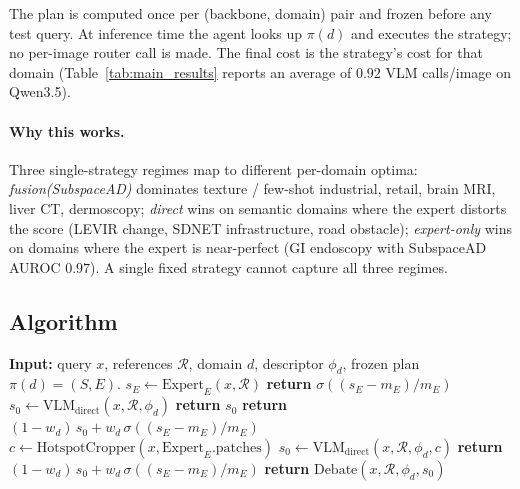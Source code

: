 The plan is computed once per (backbone, domain) pair and frozen before any test query. At inference time the agent looks up $\pi(d)$ and executes the strategy; no per-image router call is made. The final cost is the strategy's cost for that domain (Table~\ref{tab:main_results} reports an average of $0.92$ VLM calls/image on Qwen3.5).

\paragraph{Why this works.} Three single-strategy regimes map to different per-domain optima: \emph{fusion(SubspaceAD)} dominates texture / few-shot industrial, retail, brain MRI, liver CT, dermoscopy; \emph{direct} wins on semantic domains where the expert distorts the score (LEVIR change, SDNET infrastructure, road obstacle); \emph{expert-only} wins on domains where the expert is near-perfect (GI endoscopy with SubspaceAD AUROC $0.97$). A single fixed strategy cannot capture all three regimes.

\subsection{Algorithm}
\label{ssec:algorithm}

\begin{algorithm}[t]
\caption{\textsc{AnomalyClaw} agent inference.}
\label{alg:anomalyclaw}
\begin{algorithmic}[1]
\STATE \textbf{Input:} query $x$, references $\mathcal{R}$, domain $d$, descriptor $\phi_d$, frozen plan $\pi(d) = (S, E)$.
\STATE $s_E \leftarrow \mathrm{Expert}_E(x, \mathcal{R})$ \hfill{}
    \STATE \textbf{return} $\sigma((s_E - m_E)/m_E)$ \hfill{}
\ENDIF
\STATE $s_0 \leftarrow \mathrm{VLM}_{\mathrm{direct}}(x, \mathcal{R}, \phi_d)$ \hfill{}
    \STATE \textbf{return} $s_0$
    \STATE \textbf{return} $(1 - w_d)\,s_0 + w_d\,\sigma((s_E - m_E)/m_E)$
    \STATE $c \leftarrow \mathrm{HotspotCropper}(x, \mathrm{Expert}_E.\text{patches})$
    \STATE $s_0 \leftarrow \mathrm{VLM}_{\mathrm{direct}}(x, \mathcal{R}, \phi_d, c)$ \hfill{}
    \STATE \textbf{return} $(1 - w_d)\,s_0 + w_d\,\sigma((s_E - m_E)/m_E)$
    \STATE \textbf{return} $\mathrm{Debate}(x, \mathcal{R}, \phi_d, s_0)$ \hfill{}
\ENDIF
\end{algorithmic}
\end{algorithm}

